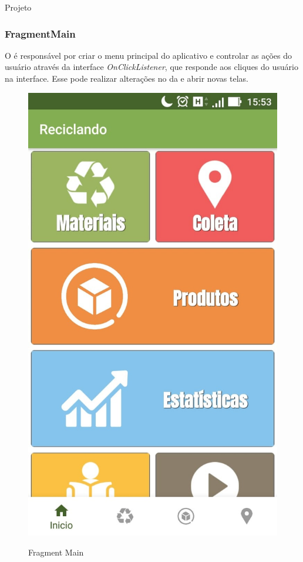 \documentclass[
	12pt,				%
	openright,			%
	twoside,			%
	a4paper,			%
	english,			%
	french,				%
	spanish,			%
	brazil				%
	]{abntex2}
\begin{document}
\begin{chapter}{Projeto}
\newpage
\subsubsection{FragmentMain} \label{main_fragment}
O  é responsável por criar o menu principal do aplicativo e controlar as ações do usuário através da interface \textit{OnClickListener}, que responde aos cliques do usuário na interface. Esse  pode realizar alterações no  da  e abrir novas telas.

\begin{figure}[h]
\centering
   \caption{Fragment Main}
   \includegraphics[scale=0.4]{media/fragment_main.jpg}
     \label{fig:fragment_main_app}
\end{figure}


\end{chapter}
\end{document}
